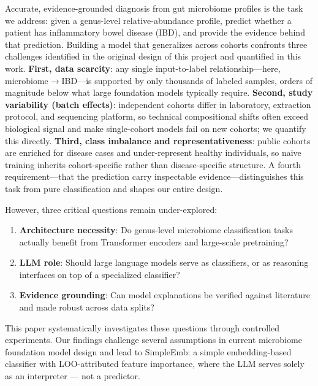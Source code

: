 \documentclass[11pt,a4paper]{article}
\begin{document}
Accurate, evidence-grounded diagnosis from gut microbiome profiles is the task we address: given a genus-level relative-abundance profile, predict whether a patient has inflammatory bowel disease (IBD), and provide the evidence behind that prediction. Building a model that generalizes across cohorts confronts three challenges identified in the original design of this project and quantified in this work. \textbf{First, data scarcity}: any single input-to-label relationship---here, microbiome$\rightarrow$IBD---is supported by only thousands of labeled samples, orders of magnitude below what large foundation models typically require. \textbf{Second, study variability (batch effects)}: independent cohorts differ in laboratory, extraction protocol, and sequencing platform, so technical compositional shifts often exceed biological signal and make single-cohort models fail on new cohorts; we quantify this directly. \textbf{Third, class imbalance and representativeness}: public cohorts are enriched for disease cases and under-represent healthy individuals, so naive training inherits cohort-specific rather than disease-specific structure. A fourth requirement---that the prediction carry inspectable evidence---distinguishes this task from pure classification and shapes our entire design.

However, three critical questions remain under-explored:

\begin{enumerate}
  \item \textbf{Architecture necessity}: Do genus-level microbiome classification tasks actually benefit from Transformer encoders and large-scale pretraining?
  \item \textbf{LLM role}: Should large language models serve as classifiers, or as reasoning interfaces on top of a specialized classifier?
  \item \textbf{Evidence grounding}: Can model explanations be verified against literature and made robust across data splits?
\end{enumerate}

This paper systematically investigates these questions through controlled experiments. Our findings challenge several assumptions in current microbiome foundation model design and lead to SimpleEmb: a simple embedding-based classifier with LOO-attributed feature importance, where the LLM serves solely as an interpreter --- not a predictor.
\end{document}
